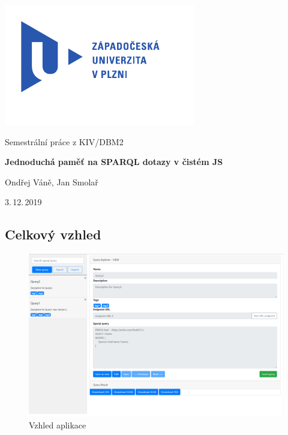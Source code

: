 \documentclass[
12pt,
a4paper,
pdftex,
czech,
titlepage
]{report}
\begin{document}
\begin{titlepage}
	\vspace*{-2cm}
	{\centering\includegraphics[scale=1.0]{img/logo.pdf}\par}
	\centering
	\vspace*{2cm}
	{\Large Semestrální práce z KIV/DBM2\par}
	\vspace{1.5cm}
	{\Huge\bfseries Jednoduchá paměť na SPARQL dotazy v čistém JS\par}
	\vspace{2cm}

	{\Large Ondřej Váně, Jan Smolař\par}

	\vfill

	{\Large 3.\,12.\,2019}
\end{titlepage}

\tableofcontents
\thispagestyle{empty}
\clearpage

\begin{landscape}
	\setcounter{page}{1}
	\chapter{Celkový vzhled}
	\begin{figure}[h]
		\centering
		\includegraphics[scale=0.36]{img/pic1.png}
		\caption{Vzhled aplikace}
		\label{img1}
	\end{figure}
\end{landscape}
\end{document}
